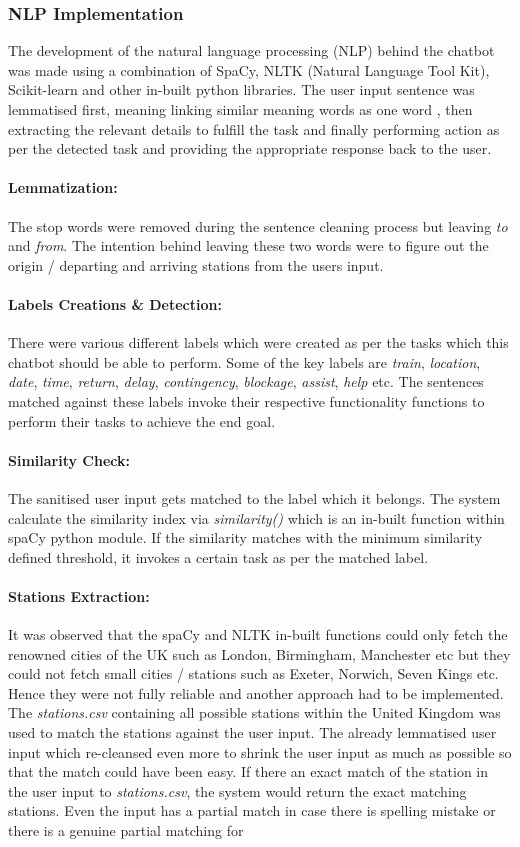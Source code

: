 \subsubsection{NLP Implementation}
The development of the natural language processing (NLP) behind the chatbot was made using a combination of SpaCy, NLTK (Natural Language Tool Kit), Scikit-learn and other in-built python libraries. The user input sentence was lemmatised first, meaning  linking similar meaning words as one word \cite{lemmatization}, then extracting the relevant details to fulfill the task and finally performing action as per the detected task and providing the appropriate response back to the user. \paragraph{Lemmatization:} The stop words were removed during the sentence cleaning process but leaving \textit{to} and \textit{from}. The intention behind leaving these two words were to figure out the origin / departing and arriving stations from the users input. \paragraph{Labels Creations \& Detection:} There were various different labels which were created as per the tasks which this chatbot should be able to perform. Some of the key labels are \textit{train}, \textit{location}, \textit{date}, \textit{time}, \textit{return}, \textit{delay}, \textit{contingency}, \textit{blockage}, \textit{assist}, \textit{help} etc. The sentences matched against these labels invoke their respective functionality functions to perform their tasks to achieve the end goal. \paragraph{Similarity Check:} The sanitised user input gets matched to the label which it belongs. The system calculate the similarity index via \textit{similarity()} which is an in-built function within spaCy python module. If the similarity matches with the minimum similarity defined threshold, it invokes a certain task as per the matched label. \paragraph{Stations Extraction: } It was observed that the spaCy and NLTK in-built functions could only fetch the renowned cities of the UK such as London, Birmingham, Manchester etc but they could not fetch small cities / stations such as Exeter, Norwich, Seven Kings etc. Hence they were not fully reliable and another approach had to be implemented. The \textit{stations.csv} containing all possible stations within the United Kingdom was used to match the stations against the user input. The already lemmatised user input which re-cleansed even more to shrink the user input as much as possible so that the match could have been easy. If there an exact match of the station in the user input to \textit{stations.csv}, the system would return the exact matching stations. Even the input has a partial match in case there is spelling mistake or there is a genuine partial matching for 